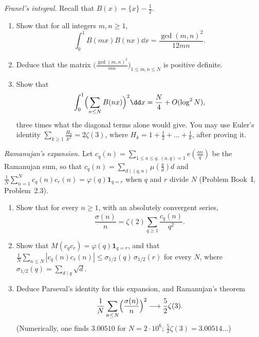 \begin{exercise}[$\star\star\star$]\label{pb:franel}
\emph{Franel's integral.} Recall that $B(x)=\{x\}-\frac12$.
\begin{enumerate}[label=(\alph*)]
\item Show that for all integers $m,n\ge1$,
\[
\int_0^1B(mx)B(nx)\dd x=\frac{\gcd(m,n)^2}{12mn}.
\]
\item Deduce that the matrix $\bigl(\frac{\gcd(m,n)^2}{mn}\bigr)_{1\le m,n\le N}$ is positive definite.
\item Show that
\[
\int_0^1\Bigl(\sum_{n\le N}B(nx)\Bigr)^2\dd x=\frac N4+O(\log^2N),
\]
three times what the diagonal terms alone would give. You may use Euler's identity $\sum_{k\ge1}\frac{H_k}{k^2}=2\zeta(3)$, where $H_k=1+\frac12+\dots+\frac1k$, after
proving it.
\end{enumerate}
\end{exercise}

\begin{exercise}[$\star\star\star$]\label{pb:ramanujan}
\emph{Ramanujan's expansion.} Let $c_q(n)=\sum_{1\le a\le q,\,(a,q)=1}e(\frac{an}q)$ be the Ramanujan sum, so that $c_q(n)=\sum_{d\mid(q,n)}\mu(\frac qd)d$ and
$\frac1N\sum_{n=1}^Nc_q(n)c_r(n)=\varphi(q)\mathbf 1_{q=r}$ when $q$ and $r$ divide $N$ (Problem Book~I, Problem~2.3).
\begin{enumerate}[label=(\alph*)]
\item Show that for every $n\ge1$, with an absolutely convergent series,
\[
\frac{\sigma(n)}n=\zeta(2)\sum_{q\ge1}\frac{c_q(n)}{q^2}.
\]
\item Show that $M(c_qc_r)=\varphi(q)\mathbf 1_{q=r}$, and that $\frac1N\sum_{n\le N}|c_q(n)c_r(n)|\le\sigma_{1/2}(q)\,\sigma_{1/2}(r)$ for every $N$, where
$\sigma_{1/2}(q)=\sum_{d\mid q}\sqrt d$.
\item Deduce Parseval's identity for this expansion, and Ramanujan's theorem
\[
\frac1N\sum_{n\le N}\Bigl(\frac{\sigma(n)}n\Bigr)^2\longrightarrow\frac52\zeta(3).
\]
(Numerically, one finds $3.00510$ for $N=2\cdot10^6$; $\frac52\zeta(3)=3.00514\ldots$)
\end{enumerate}
\end{exercise}

